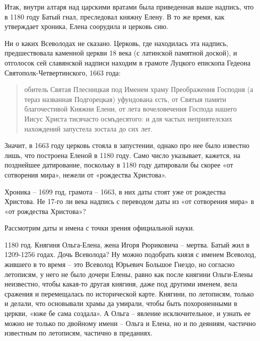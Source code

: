 Итак, внутри алтаря над царскими вратами была приведенная выше надпись, что в 1180 году Батый гнал, преследовал княжну Елену. В то же время, как утверждает хроника, Елена соорудила и церковь сию.

Ни о каких Всеволодах не сказано. Церковь, где находилась эта надпись, предшествовала каменной церкви 18 века (с латинской памятной доской), и отголосок сей славянской надписи находим в грамоте Луцкого епископа Гедеона Святополк-Четвертинского, 1663 года:

\begin{quotation}
обитель Святая Плесницкая под Именем храму Преображения Господня (а тераз названная Подгорецкая) уфундована єсть, от Святыя памяти благочестивой Княжни Елени, от лета вочеловечения Господа нашего Иисус Христа тисячасто осмъдесятого: и для частых неприятелских нахождений запустела зостала до сих лет.
\end{quotation}

Значит, в 1663 году церковь стояла в запустении, однако про нее было известно лишь, что построена Еленой в 1180 году. Само число указывает, кажется, на позднейшее датирование, поскольку в 1180 году датировали бы скорее «от сотворения мира», нежели от «рождества Христова».

Хроника – 1699 год, грамота – 1663, в них даты стоят уже от рождества Христова. Не 17-го ли века надпись с переводом даты из «от сотворения мира» в «от рождества Христова»?


Рассмотрим даты и имена с точки зрения официальной науки. 

1180 год. Княгиня Ольга-Елена, жена Игоря Рюриковича – мертва. Батый жил в 1209-1256 годах. Дочь Всеволода? Ну можно подобрать князя с именем Всеволод, жившего в то время – это Всеволод Юрьевич Большое Гнездо, но согласно летописям, у него не было дочери Елены, равно как после княгини Ольги-Елены неизвестно, чтобы какая-то другая княгиня, даже под другими именем, вела сражения и перемещалась по исторической карте. Княгини, по летописям, только и делали, что основывали храмы да умирали, чтобы быть похороненными в церкви, «юже бе сама создала». А Ольга – явление исключительное, и узнать ее можно не только по двойному имени – Ольга и Елена, но и по деяниям, частично известным по летописям, частично в преданиях.

